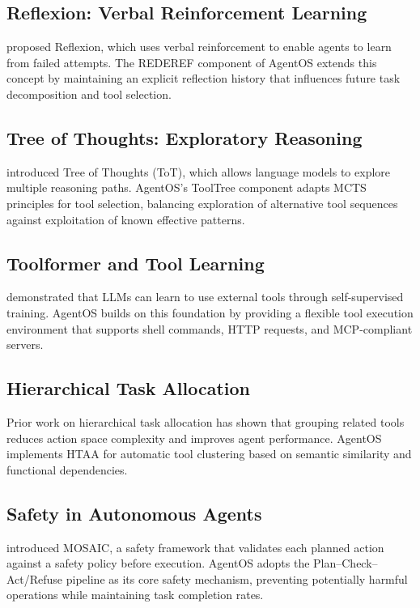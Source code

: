 \documentclass[12pt,a4paper]{article}
\begin{document}
\subsection{Reflexion: Verbal Reinforcement Learning}

\citet{shinn2023reflexion} proposed Reflexion, which uses verbal reinforcement to enable agents to learn from failed attempts. The REDEREF component of AgentOS extends this concept by maintaining an explicit reflection history that influences future task decomposition and tool selection.

\subsection{Tree of Thoughts: Exploratory Reasoning}

\citep{yao2023tree} introduced Tree of Thoughts (ToT), which allows language models to explore multiple reasoning paths. AgentOS's ToolTree component adapts MCTS principles for tool selection, balancing exploration of alternative tool sequences against exploitation of known effective patterns.

\subsection{Toolformer and Tool Learning}

\citet{schick2023toolformer} demonstrated that LLMs can learn to use external tools through self-supervised training. AgentOS builds on this foundation by providing a flexible tool execution environment that supports shell commands, HTTP requests, and MCP-compliant servers.

\subsection{Hierarchical Task Allocation}

Prior work on hierarchical task allocation \citep{dorward2023htaa} has shown that grouping related tools reduces action space complexity and improves agent performance. AgentOS implements HTAA for automatic tool clustering based on semantic similarity and functional dependencies.

\subsection{Safety in Autonomous Agents}

\citep{mosaic2024safety} introduced MOSAIC, a safety framework that validates each planned action against a safety policy before execution. AgentOS adopts the Plan--Check--Act/Refuse pipeline as its core safety mechanism, preventing potentially harmful operations while maintaining task completion rates.
\end{document}
